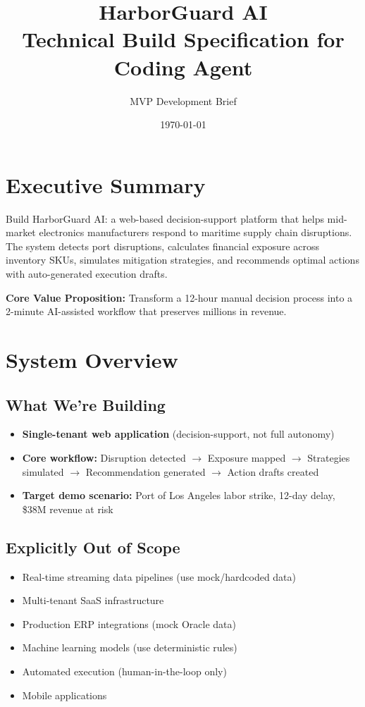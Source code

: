 \documentclass[11pt]{article}
\title{\textbf{HarborGuard AI} \\ Technical Build Specification for Coding Agent}
\author{MVP Development Brief}
\date{\today}
\begin{document}
\maketitle

\section{Executive Summary}

Build HarborGuard AI: a web-based decision-support platform that helps mid-market electronics manufacturers respond to maritime supply chain disruptions. The system detects port disruptions, calculates financial exposure across inventory SKUs, simulates mitigation strategies, and recommends optimal actions with auto-generated execution drafts.

\textbf{Core Value Proposition:} Transform a 12-hour manual decision process into a 2-minute AI-assisted workflow that preserves millions in revenue.

\section{System Overview}

\subsection{What We're Building}
\begin{itemize}
    \item \textbf{Single-tenant web application} (decision-support, not full autonomy)
    \item \textbf{Core workflow:} Disruption detected $\rightarrow$ Exposure mapped $\rightarrow$ Strategies simulated $\rightarrow$ Recommendation generated $\rightarrow$ Action drafts created
    \item \textbf{Target demo scenario:} Port of Los Angeles labor strike, 12-day delay, \$38M revenue at risk
\end{itemize}

\subsection{Explicitly Out of Scope}
\begin{itemize}
    \item Real-time streaming data pipelines (use mock/hardcoded data)
    \item Multi-tenant SaaS infrastructure
    \item Production ERP integrations (mock Oracle data)
    \item Machine learning models (use deterministic rules)
    \item Automated execution (human-in-the-loop only)
    \item Mobile applications
\end{itemize}
\end{document}
